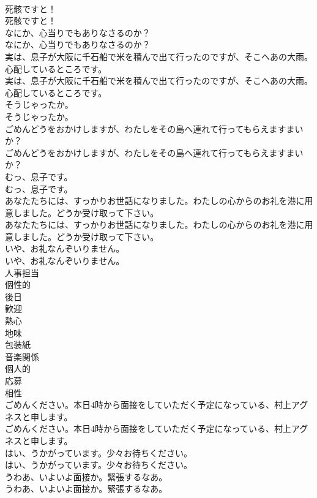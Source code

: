 \documentclass[8pt]{extreport}
\begin{document}
\begin{CJK}{UTF8}{min}
\\	死骸ですと！	
\\	死骸ですと！ 
\\	なにか、心当りでもありなさるのか？	
\\	なにか、心当りでもありなさるのか？ 
\\	実は、息子が大阪に千石船で米を積んで出て行ったのですが、そこへあの大雨。心配しているところです。	
\\	実は、息子が大阪に千石船で米を積んで出て行ったのですが、そこへあの大雨。心配しているところです。 
\\	そうじゃったか。	
\\	そうじゃったか。 
\\	ごめんどうをおかけしますが、わたしをその島へ連れて行ってもらえますまいか？	
\\	ごめんどうをおかけしますが、わたしをその島へ連れて行ってもらえますまいか？ 
\\	むっ、息子です。	
\\	むっ、息子です。 
\\	あなたたちには、すっかりお世話になりました。わたしの心からのお礼を港に用意しました。どうか受け取って下さい。	
\\	あなたたちには、すっかりお世話になりました。わたしの心からのお礼を港に用意しました。どうか受け取って下さい。 
\\	いや、お礼なんぞいりません。	
\\	いや、お礼なんぞいりません。 
\\	人事担当
\\	個性的
\\	後日
\\	歓迎
\\	熱心
\\	地味
\\	包装紙
\\	音楽関係
\\	個人的
\\	応募
\\	相性
\\	ごめんください。本日4時から面接をしていただく予定になっている、村上アグネスと申します。	
\\	ごめんください。本日4時から面接をしていただく予定になっている、村上アグネスと申します。 
\\	はい、うかがっています。少々お待ちください。	
\\	はい、うかがっています。少々お待ちください。 
\\	うわあ、いよいよ面接か。緊張するなあ。	
\\	うわあ、いよいよ面接か。緊張するなあ。 

\end{CJK}
\end{document}

